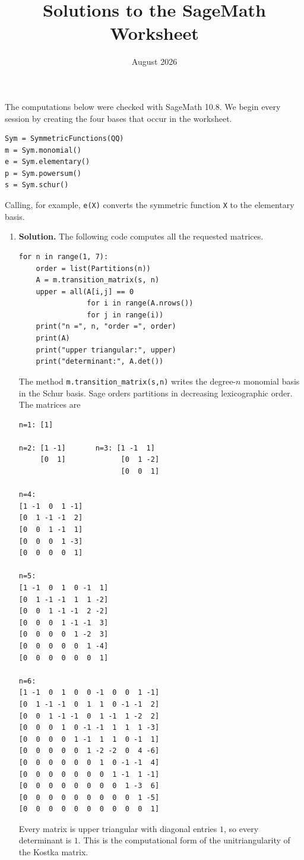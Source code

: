 \documentclass{article}
\title{Solutions to the SageMath Worksheet}
\author{}
\date{August 2026}
\begin{document}
\maketitle

The computations below were checked with SageMath 10.8.  We begin every
session by creating the four bases that occur in the worksheet.
\begin{verbatim}
Sym = SymmetricFunctions(QQ)
m = Sym.monomial()
e = Sym.elementary()
p = Sym.powersum()
s = Sym.schur()
\end{verbatim}
Calling, for example, \texttt{e(X)} converts the symmetric function
\texttt{X} to the elementary basis.

\begin{enumerate}
\item \textbf{Solution.}
The following code computes all the requested matrices.
\begin{verbatim}
for n in range(1, 7):
    order = list(Partitions(n))
    A = m.transition_matrix(s, n)
    upper = all(A[i,j] == 0
                for i in range(A.nrows())
                for j in range(i))
    print("n =", n, "order =", order)
    print(A)
    print("upper triangular:", upper)
    print("determinant:", A.det())
\end{verbatim}
The method \texttt{m.transition\_matrix(s,n)} writes the degree-$n$
monomial basis in the Schur basis.  Sage orders partitions in decreasing
lexicographic order.  The matrices are
\begin{verbatim}
n=1: [1]

n=2: [1 -1]       n=3: [1 -1  1]
     [0  1]             [0  1 -2]
                        [0  0  1]

n=4:
[1 -1  0  1 -1]
[0  1 -1 -1  2]
[0  0  1 -1  1]
[0  0  0  1 -3]
[0  0  0  0  1]

n=5:
[1 -1  0  1  0 -1  1]
[0  1 -1 -1  1  1 -2]
[0  0  1 -1 -1  2 -2]
[0  0  0  1 -1 -1  3]
[0  0  0  0  1 -2  3]
[0  0  0  0  0  1 -4]
[0  0  0  0  0  0  1]

n=6:
[1 -1  0  1  0  0 -1  0  0  1 -1]
[0  1 -1 -1  0  1  1  0 -1 -1  2]
[0  0  1 -1 -1  0  1 -1  1 -2  2]
[0  0  0  1  0 -1 -1  1  1  1 -3]
[0  0  0  0  1 -1  1  1  0 -1  1]
[0  0  0  0  0  1 -2 -2  0  4 -6]
[0  0  0  0  0  0  1  0 -1 -1  4]
[0  0  0  0  0  0  0  1 -1  1 -1]
[0  0  0  0  0  0  0  0  1 -3  6]
[0  0  0  0  0  0  0  0  0  1 -5]
[0  0  0  0  0  0  0  0  0  0  1]
\end{verbatim}
Every matrix is upper triangular with diagonal entries $1$, so every
determinant is $1$.  This is the computational form of the
unitriangularity of the Kostka matrix.


\end{enumerate}
\end{document}
